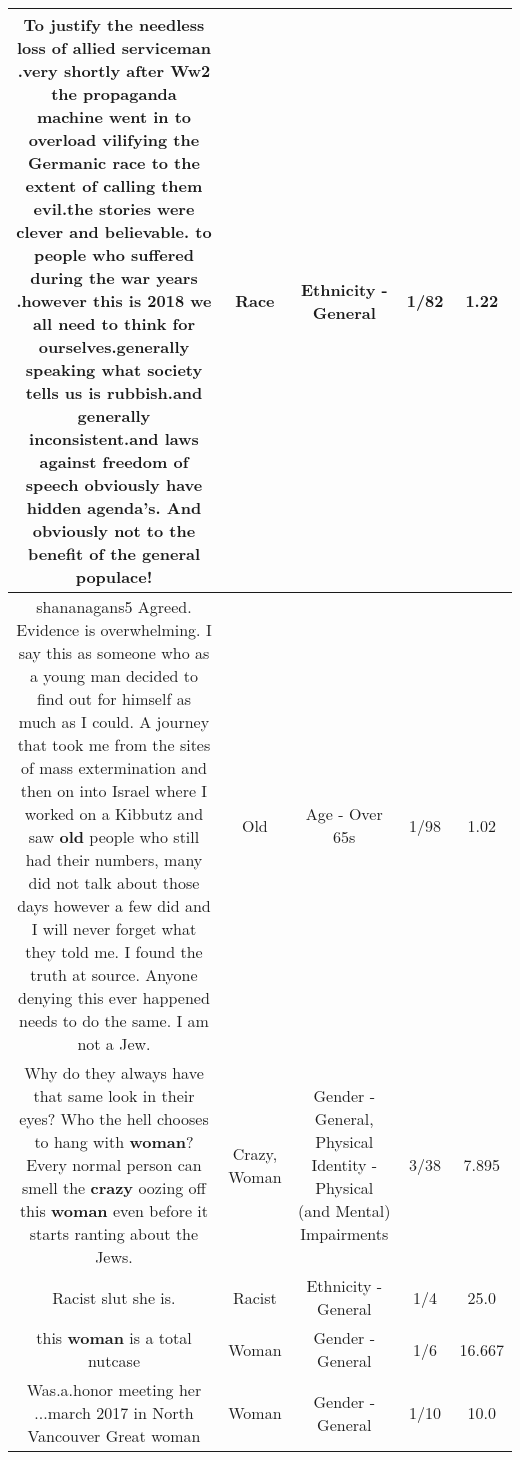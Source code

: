 \documentclass[11pt]{article}
\newlength\mylength
\begin{document}
\begin{center}
\begin{longtable}{|C{.65\mylength}|C{.30\mylength}|C{.12\mylength}|C{.12\mylength}|C{.12\mylength}|}
  \small To justify the needless loss of allied serviceman .very shortly after Ww2 the propaganda machine went in to overload vilifying the Germanic \textbf{race} to the extent of calling them evil.the stories were clever and believable. to people who suffered during the war years .however this is 2018 we all need to think for ourselves.generally speaking what society tells us is rubbish.and generally inconsistent.and laws against freedom of speech obviously have hidden agenda's. And obviously not to the benefit of the general populace!\normalsize   & Race & Ethnicity - General & 1/82 & 1.22 \\  \hline
  \small shananagans5 Agreed. Evidence is overwhelming. I say this as someone who as a young man decided to find out for himself as much as I could. A journey that took me from the sites of mass extermination and then on into Israel where I worked on a Kibbutz and saw \textbf{old} people who still had their numbers, many did not talk about those days however a few did and I will never forget what they told me. I found the truth at source. Anyone denying this ever happened needs to do the same. I am not a Jew.\normalsize   & Old & Age - Over 65s & 1/98 & 1.02 \\  \hline
  \small Why do they always have that same look in their eyes? Who the hell chooses to hang with \textbf{woman}? Every normal person can smell the \textbf{crazy} oozing off this \textbf{woman} even before it starts ranting about the Jews.\normalsize   & Crazy, Woman & Gender - General, Physical Identity - Physical (and Mental) Impairments & 3/38 & 7.895 \\  \hline
  \small Racist slut she is.\normalsize   & Racist & Ethnicity - General & 1/4 & 25.0 \\  \hline
  \small this \textbf{woman} is a total nutcase\normalsize   & Woman & Gender - General & 1/6 & 16.667 \\  \hline
  \small Was.a.honor meeting her ...march 2017 in North Vancouver Great woman\normalsize   & Woman & Gender - General & 1/10 & 10.0 \\  \hline

\end{longtable}
\end{center}
\end{document}

